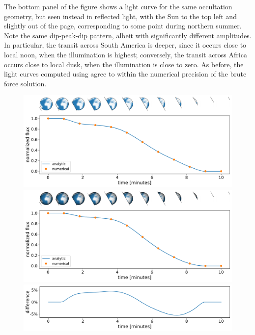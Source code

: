 \documentclass[modern]{aastex62}
\begin{document}
The bottom panel of the figure shows a light curve for the
same occultation geometry, but seen instead in reflected light, with the
Sun to the top left and slightly out of the page, corresponding to
some point during northern summer. Note the same dip-peak-dip pattern,
albeit with significantly different amplitudes. In particular, the
transit across South America is deeper, since it occurs close to local
noon, when the illumination is highest; conversely, the transit across
Africa occurs close to local dusk, when the illumination is close to zero.
As before, the light curves computed using \starry agree to within the
numerical precision of the brute force solution.

%

\begin{figure}[p!]
    \begin{centering}
        \includegraphics[width=\linewidth]{figures/earthsun_emitted.pdf}
        \includegraphics[width=\linewidth]{figures/earthsun.pdf}
        \includegraphics[width=\linewidth]{figures/earthsun_diff.pdf}
\end{centering}
\end{figure}
\end{document}
